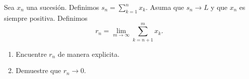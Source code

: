 \documentclass{ayudantia}
\begin{document}
\begin{prob}
    Sea \(x_n\) una sucesión. Definimos \(s_n=\sum_{k=1}^nx_k\). Asuma que \(s_n\rightarrow L\) y que \(x_n\) es siempre positiva. Definimos
    \begin{equation*}
        r_n=\lim_{m\rightarrow\infty}\sum_{k=n+1}^mx_k.
    \end{equation*}
    \begin{enumerate}[label=(\alph*)]
        \item Encuentre \(r_n\) de manera explicita.
        \item Demuestre que \(r_n\rightarrow 0\).
    \end{enumerate}
\end{prob}

\begin{ans}
    \begin{sol}

    \end{sol}
\end{ans}
\end{document}
